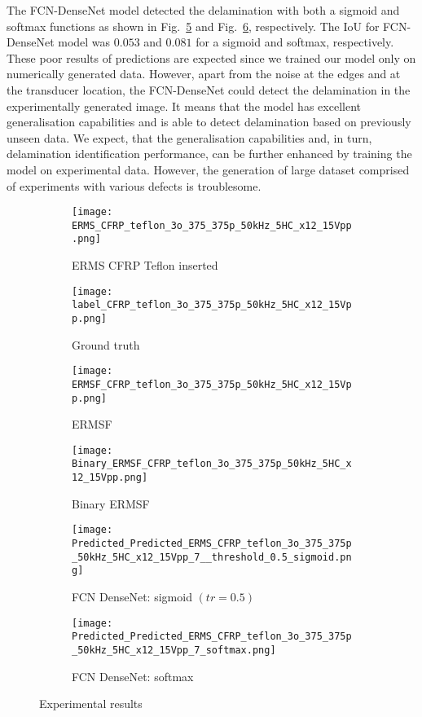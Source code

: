 The FCN-DenseNet model detected the delamination with both a sigmoid and softmax functions as shown in Fig.~\ref{fig:EXP_predict_sigmoid} and Fig.~\ref{fig:EXP_predict_softmax}, respectively.
The IoU for FCN-DenseNet model was \(0.053\) and \(0.081\) for a sigmoid and softmax, respectively.
These poor results of predictions are expected since we trained our model only on numerically generated data.
However, apart from the noise at the edges and at the transducer location, the FCN-DenseNet could detect the delamination in the experimentally generated image.
It means that the model has excellent generalisation capabilities and is able to detect delamination based on previously unseen data.
We expect, that the generalisation capabilities and, in turn, delamination identification performance, can be further enhanced by training the model on experimental data.
However, the generation of large dataset comprised of experiments with various defects is troublesome.
	\begin{figure} [!h]
		\centering
		\begin{subfigure}[b]{0.47\textwidth}
			\centering
			\texttt{[image: ERMS\_CFRP\_teflon\_3o\_375\_375p\_50kHz\_5HC\_x12\_15Vpp.png]}
			\caption{ERMS CFRP Teflon inserted}
			\label{fig:Delamination}
		\end{subfigure}			
		\hfill
		\begin{subfigure}[b]{0.47\textwidth}
			\centering 	
			\texttt{[image: label\_CFRP\_teflon\_3o\_375\_375p\_50kHz\_5HC\_x12\_15Vpp.png]}
			\caption{Ground truth} 
			\label{fig:damage_label}
		\end{subfigure}
		\hfill
		\begin{subfigure}[b]{0.47\textwidth}
			\centering
			\texttt{[image: ERMSF\_CFRP\_teflon\_3o\_375\_375p\_50kHz\_5HC\_x12\_15Vpp.png]}
			\caption{ERMSF} 
			\label{fig:ERMSF_CFRP_teflon}
		\end{subfigure}
		\hfill
		\begin{subfigure}[b]{0.47\textwidth}
		\centering
		\texttt{[image: Binary\_ERMSF\_CFRP\_teflon\_3o\_375\_375p\_50kHz\_5HC\_x12\_15Vpp.png]}
		\caption{Binary ERMSF} 
		\label{fig:Binary_ERMSF_CFRP}
		\end{subfigure}
		\hfill
		\begin{subfigure}[b]{0.47\textwidth}
			\centering
			\texttt{[image: Predicted\_Predicted\_ERMS\_CFRP\_teflon\_3o\_375\_375p\_50kHz\_5HC\_x12\_15Vpp\_7\_\_threshold\_0.5\_sigmoid.png]}
			\caption{FCN DenseNet: sigmoid \((tr = 0.5)\)} 
			\label{fig:EXP_predict_sigmoid}
		\end{subfigure}
		\hfill
		\begin{subfigure}[b]{0.47\textwidth}
			\centering
			\texttt{[image: Predicted\_Predicted\_ERMS\_CFRP\_teflon\_3o\_375\_375p\_50kHz\_5HC\_x12\_15Vpp\_7\_softmax.png]}
			\caption{FCN DenseNet: softmax} 
			\label{fig:EXP_predict_softmax}
		\end{subfigure}
			\caption{Experimental results}
			\label{fig:Exp_ERMS_teflon}
		\end{figure}

